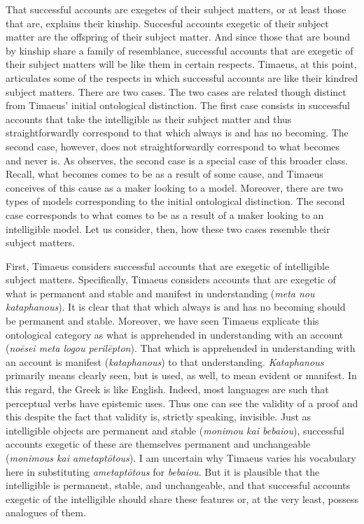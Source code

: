 That successful accounts are exegetes of their subject matters, or at least those that are, explains their kinship. Succesful accounts exegetic of their subject matter are the offspring of their subject matter. And since those that are bound by kinship share a family of resemblance, successful accounts that are exegetic of their subject matters will be like them in certain respects. Timaeus, at this point, articulates some of the respects in which successful accounts are like their kindred subject matters. There are two cases. The two cases are related though distinct from Timaeus' initial ontological distinction. The first case consists in successful accounts that take the intelligible as their subject matter and thus straightforwardly correspond to that which always is and has no becoming. The second case, however, does not straightforwardly correspond to what becomes and never is. As \citet{Betegh:2010aa} observes, the second case is a special case of this broader class. Recall, what becomes comes to be as a result of some cause, and Timaeus conceives of this cause as a maker looking to a model. Moreover, there are two types of models corresponding to the initial ontological distinction. The second case corresponds to what comes to be as a result of a maker looking to an intelligible model. Let us consider, then, how these two cases resemble their subject matters.

First, Timaeus considers successful accounts that are exegetic of intelligible subject matters. Specifically, Timaeus considers accounts that are exegetic of what is permanent and stable and manifest in understanding (\emph{meta nou kataphanous}). It is clear that that which always is and has no becoming should be permanent and stable. Moreover, we have seen Timaeus explicate this ontological category as what is apprehended in understanding with an account (\emph{noēsei meta logou perilēpton}). That which is apprehended in understanding with an account is manifest (\emph{kataphanous}) to that understanding. \emph{Kataphanous} primarily means clearly seen, but is used, as well, to mean evident or manifest. In this regard, the Greek is like English. Indeed, most languages are such that perceptual verbs have epistemic uses. Thus one can see the validity of a proof and this despite the fact that validity is, strictly speaking, invisible. Just as intelligible objects are permanent and stable (\emph{monimou kai bebaiou}), successful accounts exegetic of these are themselves permanent and unchangeable (\emph{monimous kai ametaptōtous}). I am uncertain why Timaeus varies his vocabulary here in substituting \emph{ametaptōtous} for \emph{bebaiou}. But it is plausible that the intelligible is permanent, stable, and unchangeable, and that successful accounts exegetic of the intelligible should share these features or, at the very least, possess analogues of them.

